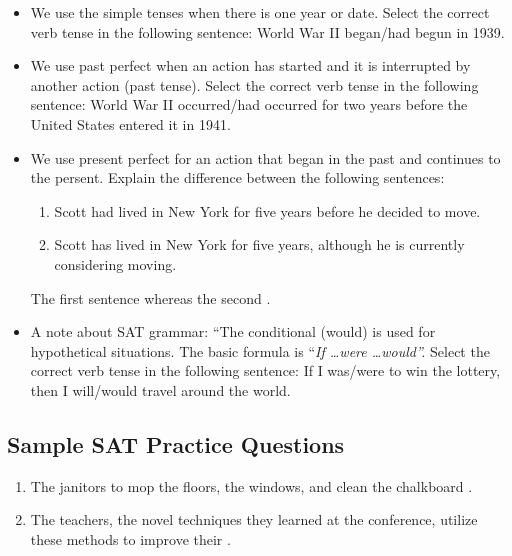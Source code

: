 \begin{itemize}
\item{We use the simple tenses when there is one year or date. Select the correct verb tense in the following sentence: World War II
began/had begun in 1939.}
\item{We use past perfect when an action has started and it is interrupted by another action (past
tense). Select the correct verb tense in the following sentence: World War II occurred/had occurred for two years before the United
States entered it in 1941.}
\item{We use present perfect for an action that began in the past and continues to the persent.
Explain the difference between the following sentences:}

\begin{enumerate}
\item{Scott had lived in New York for five years before he decided to move.}
\item{Scott has lived in New York for five years, although he is currently considering moving.}
\end{enumerate}

The first sentence \hrulefill whereas the second \hrulefill.

\item A note about SAT grammar: ``The conditional (would) is used for hypothetical situations. The basic formula is ``\textit{If \ldots were \ldots would''.} Select the correct verb tense in the following sentence: If I was/were to win the lottery, then I will/would travel around the world.

\end{itemize}

\subsection{Sample SAT Practice Questions}

\begin{enumerate}
\item \begin{inparaenum}[A]
The janitors   to mop the floors,  the windows, and clean the chalkboard . 
\end{inparaenum}

\item \begin{inparaenum}[A]
The teachers,  the novel  techniques they learned at the conference,  utilize these methods to improve their .  
\end{inparaenum}

\end{enumerate}